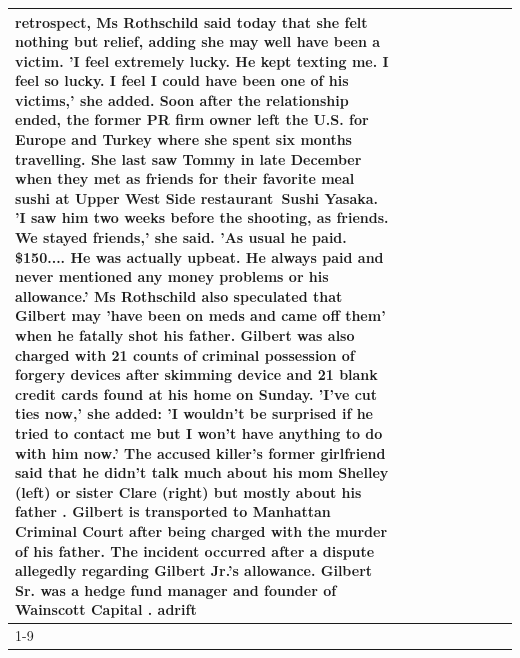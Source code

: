 \begin{table}[H]
\begin{tabular}{lllrlllll}
retrospect, Ms Rothschild said today that she felt nothing but relief, adding she may well have been a victim. 'I feel extremely lucky. He kept texting me. I feel so lucky. I feel I could have been one of his victims,' she added. Soon after the relationship ended, the former PR firm owner left the U.S. for Europe and Turkey where she spent six months  travelling. She last saw Tommy in late December when they met as friends for their favorite meal sushi at Upper West Side restaurant Sushi Yasaka. 'I saw him two weeks before the shooting, as friends. We stayed friends,' she said. 'As usual he paid. \$150.... He was actually upbeat. He always paid and never mentioned any money problems or his allowance.' Ms Rothschild also speculated that Gilbert may 'have been on meds and came off them' when he fatally shot his father. Gilbert was also charged with 21 counts of criminal possession of forgery devices after skimming device and 21 blank credit cards found at his home on Sunday. 'I've cut ties now,' she added: 'I wouldn’t be surprised if he tried to contact me but I won’t have anything to do with him now.' The accused killer's former girlfriend said that he didn't talk much about his mom Shelley (left) or sister Clare (right) but mostly about his father . Gilbert is transported to Manhattan Criminal Court  after being charged with the murder of his father. The incident occurred after a dispute allegedly regarding Gilbert Jr.'s allowance. Gilbert Sr. was a hedge fund manager and founder of Wainscott Capital . adrift \\
\cline{1-9} \cline{2-9}

\end{tabular}
\end{table}
